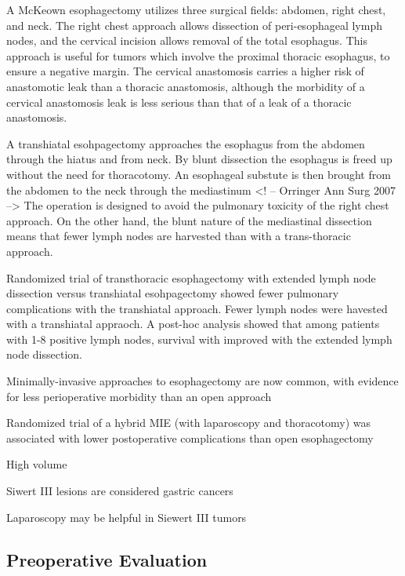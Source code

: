 \documentclass[
]{book}
\begin{document}
A McKeown esophagectomy utilizes three surgical fields: abdomen, right chest, and neck. The right chest approach allows dissection of peri-esophageal lymph nodes, and the cervical incision allows removal of the total esophagus.\citep{mckeown259} This approach is useful for tumors which involve the proximal thoracic esophagus, to ensure a negative margin. The cervical anastomosis carries a higher risk of anastomotic leak than a thoracic anastomosis, although the morbidity of a cervical anastomosis leak is less serious than that of a leak of a thoracic anastomosis.

A transhiatal esohpagectomy approaches the esophagus from the abdomen through the hiatus and from neck. By blunt dissection the esophagus is freed up without the need for thoracotomy. An esophageal substute is then brought from the abdomen to the neck through the mediastinum\citep{orringer643} \citep{orringer363}\textless! -- Orringer Ann Surg 2007 --\textgreater{} The operation is designed to avoid the pulmonary toxicity of the right chest approach. On the other hand, the blunt nature of the mediastinal dissection means that fewer lymph nodes are harvested than with a trans-thoracic approach.

Randomized trial of transthoracic esophagectomy with extended lymph node dissection versus transhiatal esohpagectomy showed fewer pulmonary complications with the transhiatal approach. \citep{hulscher1662} Fewer lymph nodes were havested with a transhiatal appraoch. A post-hoc analysis showed that among patients with 1-8 positive lymph nodes, survival with improved with the extended lymph node dissection.\citep{omloo992}

Minimally-invasive approaches to esophagectomy are now common, with evidence for less perioperative morbidity than an open approach \citep{biere1887} \citep{zhoue0132889}

Randomized trial of a hybrid MIE (with laparoscopy and thoracotomy) was associated with lower postoperative complications than open esophagectomy \citep{mariette152}

High volume \citep{birkmeyer2117} \citep{wouters1789}

Siwert III lesions are considered gastric cancers \citep{rusch444} \citep{siewert260}

Laparoscopy may be helpful in Siewert III tumors \citep{degraaf988}

\hypertarget{preoperative-evaluation}{%
\subsection{Preoperative Evaluation}\label{preoperative-evaluation}}
\end{document}
